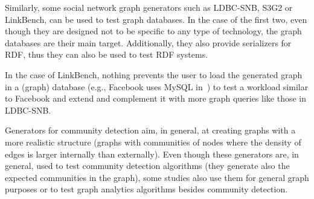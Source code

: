 Similarly, some social network graph generators such as LDBC-SNB, S3G2 or
LinkBench, can be used to test graph databases. In the case of the first two,
even though they are designed not to be specific to any type of technology,
the graph databases are their main target.  Additionally, they also provide serializers for
RDF, thus they can also be used to test RDF systems.

In the case of LinkBench, nothing prevents the user to load the generated graph
in a (graph) database (e.g., Facebook uses MySQL in~\cite{Armstrong:2013:LDB:2463676.2465296}) to
test a workload similar to Facebook and extend and complement it with more
graph queries like those in LDBC-SNB.

Generators for community detection aim, in general, at creating graphs with a
more realistic structure (graphs with communities of nodes where the density of
edges is larger internally than externally). Even though these generators are,
in general, used to test community detection algorithms (they generate also the
expected communities in the graph), some studies also use them for general graph
purposes or to test graph analytics algorithms besides community detection.
